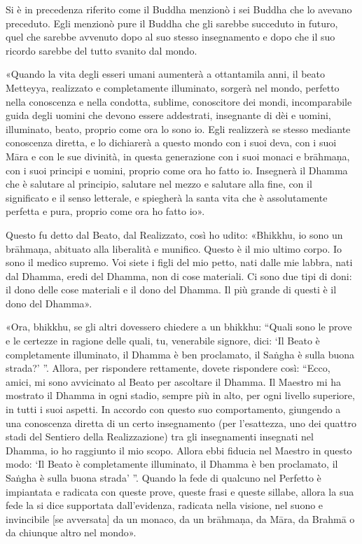  Si è in precedenza riferito come il Buddha
menzionò i sei Buddha che lo avevano preceduto. Egli menzionò pure il Buddha che
gli sarebbe succeduto in futuro, quel che sarebbe avvenuto dopo al suo stesso
insegnamento e dopo che il suo ricordo sarebbe del tutto svanito dal mondo.

 «Quando la vita degli esseri umani aumenterà a ottantamila
anni, il beato Metteyya, realizzato e completamente illuminato, sorgerà nel
mondo, perfetto nella conoscenza e nella condotta, sublime, conoscitore dei
mondi, incomparabile guida degli uomini che devono essere addestrati, insegnante
di dèi e uomini, illuminato, beato, proprio come ora lo sono io. Egli realizzerà
se stesso mediante conoscenza diretta, e lo dichiarerà a questo mondo con i suoi
deva, con i suoi Māra e con le sue divinità, in questa generazione con i suoi
monaci e brāhmaṇa, con i suoi principi e uomini, proprio come ora ho fatto io.
Insegnerà il Dhamma che è salutare al principio, salutare nel mezzo e salutare
alla fine, con il significato e il senso letterale, e spiegherà la santa vita
che è assolutamente perfetta e pura, proprio come ora ho fatto io».


Questo fu detto dal Beato, dal Realizzato, così ho udito: «Bhikkhu, io sono un
brāhmaṇa, abituato alla liberalità e munifico. Questo è il mio ultimo corpo. Io
sono il medico supremo. Voi siete i figli del mio petto, nati dalle mie labbra,
nati dal Dhamma, eredi del Dhamma, non di cose materiali. Ci sono due tipi di
doni: il dono delle cose materiali e il dono del Dhamma. Il più grande di questi
è il dono del Dhamma».


\label{pag222}%
«Ora, bhikkhu, se gli altri dovessero chiedere a un bhikkhu: “Quali sono le
prove e le certezze in ragione delle quali, tu, venerabile signore, dici: ‘Il
Beato è completamente illuminato, il Dhamma è ben proclamato, il Saṅgha è sulla
buona strada?’ ”. Allora, per rispondere rettamente, dovete rispondere così:
“Ecco, amici, mi sono avvicinato al Beato per ascoltare il Dhamma. Il Maestro mi
ha mostrato il Dhamma in ogni stadio, sempre più in alto, per ogni livello
superiore, in tutti i suoi aspetti. In accordo con questo suo comportamento,
giungendo a una conoscenza diretta di un certo insegnamento (per l’esattezza,
uno dei quattro stadi del Sentiero della Realizzazione) tra gli insegnamenti
insegnati nel Dhamma, io ho raggiunto il mio scopo. Allora ebbi fiducia nel
Maestro in questo modo: ‘Il Beato è completamente illuminato, il Dhamma è ben
proclamato, il Saṅgha è sulla buona strada’ ”. Quando la fede di qualcuno nel
Perfetto è impiantata e radicata con queste prove, queste frasi e queste
sillabe, allora la sua fede la si dice supportata dall’evidenza, radicata nella
visione, nel suono e invincibile [se avversata] da un monaco, da un brāhmaṇa, da
Māra, da Brahmā o da chiunque altro nel mondo».


